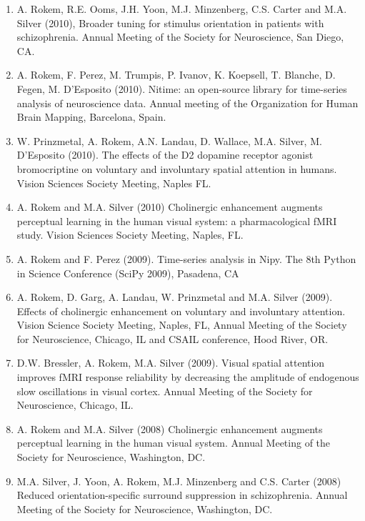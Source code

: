 \documentclass[11pt,fullpage]{article}
\begin{document}
\begin{enumerate}
\item A. Rokem, R.E. Ooms, J.H. Yoon, M.J. Minzenberg, C.S. Carter and M.A. Silver (2010), Broader tuning for stimulus orientation in patients with schizophrenia. Annual Meeting of the Society for Neuroscience, San Diego, CA.

\item A. Rokem, F. Perez, M. Trumpis, P. Ivanov, K. Koepsell, T. Blanche, D. Fegen, M. D'Esposito (2010). Nitime: an open-source library for time-series analysis of neuroscience data. Annual meeting of the Organization for Human Brain Mapping, Barcelona, Spain.

\item W. Prinzmetal, A. Rokem, A.N. Landau, D. Wallace, M.A. Silver, M. D’Esposito (2010). The effects of the D2 dopamine receptor agonist bromocriptine on voluntary and involuntary spatial attention in humans. Vision Sciences Society Meeting, Naples FL.

\item A. Rokem and M.A. Silver (2010) Cholinergic enhancement augments perceptual learning in the human visual system: a pharmacological fMRI study. Vision Sciences Society Meeting, Naples, FL.

\item A. Rokem and F. Perez (2009). Time-series analysis in Nipy. The 8th Python in Science Conference (SciPy 2009), Pasadena, CA

\item A. Rokem, D. Garg, A. Landau, W. Prinzmetal and M.A. Silver (2009). Effects of cholinergic enhancement on voluntary and involuntary attention. Vision Science Society Meeting, Naples, FL, Annual Meeting of the Society for Neuroscience, Chicago, IL and CSAIL conference, Hood River, OR.

\item D.W. Bressler, A. Rokem, M.A. Silver (2009). Visual spatial attention improves fMRI response reliability by decreasing the amplitude of endogenous slow oscillations in visual cortex. Annual Meeting of the Society for Neuroscience, Chicago, IL.

\item A. Rokem and M.A. Silver (2008) Cholinergic enhancement augments perceptual learning in the human visual system. Annual Meeting of the Society for Neuroscience, Washington, DC.

\item M.A. Silver, J. Yoon, A. Rokem, M.J. Minzenberg and C.S. Carter (2008) Reduced orientation-specific surround suppression in schizophrenia. Annual Meeting of the Society for Neuroscience, Washington, DC.


\end{enumerate}
\end{document}
